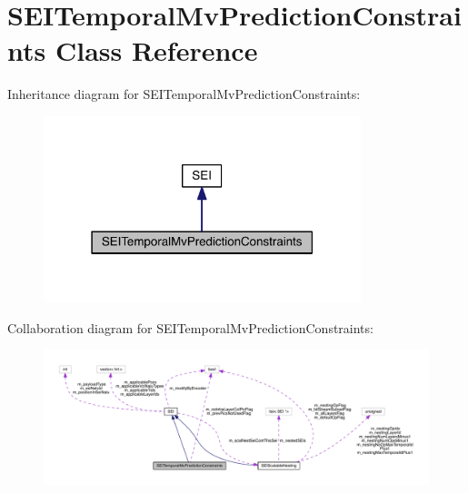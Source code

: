 \hypertarget{class_s_e_i_temporal_mv_prediction_constraints}{}\section{S\+E\+I\+Temporal\+Mv\+Prediction\+Constraints Class Reference}
\label{class_s_e_i_temporal_mv_prediction_constraints}


Inheritance diagram for S\+E\+I\+Temporal\+Mv\+Prediction\+Constraints\+:
\nopagebreak
\begin{figure}[H]
\begin{center}
\leavevmode
\includegraphics[width=262pt]{db/d40/class_s_e_i_temporal_mv_prediction_constraints__inherit__graph}
\end{center}
\end{figure}


Collaboration diagram for S\+E\+I\+Temporal\+Mv\+Prediction\+Constraints\+:
\nopagebreak
\begin{figure}[H]
\begin{center}
\leavevmode
\includegraphics[width=350pt]{d3/d24/class_s_e_i_temporal_mv_prediction_constraints__coll__graph}
\end{center}
\end{figure}
